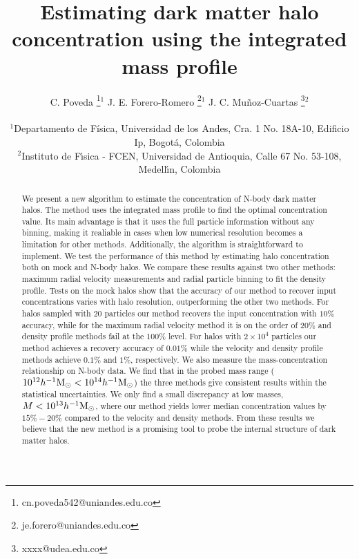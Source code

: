 \documentclass[a4,useAMS,usenatbib,usegraphicx]{mn2e}
\newcommand{\hMsun}{{\ifmmode{h^{-1}{\rm {M_{\odot}}}}\else{$h^{-1}{\rm{M_{\odot}}}$}\fi}}
\begin{document}
\title[Halo concentration from the mass profile]{Estimating dark matter
  halo concentration using the integrated mass profile} 
\author[C. Poveda, J.E. Forero-Romero, J.C. Mu\~noz-Cuartas]{
\parbox[t]{\textwidth}{\raggedright 
  C. Poveda \thanks{cn.poveda542@uniandes.edu.co}$^{1}$
  J. E. Forero-Romero \thanks{je.forero@uniandes.edu.co}$^{1}$
  J. C. Mu\~noz-Cuartas \thanks{xxxx@udea.edu.co}$^{2}$
}
\vspace*{6pt}\\
$^1$Departamento de F\'{i}sica, Universidad de los Andes, Cra. 1
No. 18A-10, Edificio Ip, Bogot\'a, Colombia\\
$^2$Instituto de F\'{\i}sica - FCEN, Universidad de Antioquia, Calle
67 No. 53-108, Medell\'{\i}n, Colombia
}

\maketitle

\begin{abstract}
We present a new algorithm to estimate the concentration of N-body
dark matter halos.
The method uses the integrated mass profile to find the optimal
concentration value. 
Its main advantage is that it uses the full particle information
without any binning, making it realiable in  cases when low numerical
resolution becomes a limitation for other methods.  
Additionally, the algorithm is straightforward to implement.  
We test the performance of this method by estimating halo
concentration both on mock and N-body halos. 
We compare these results against two other methods:
maximum radial velocity measurements and radial particle binning to
fit the density profile. 
Tests on the mock halos show that the accuracy of our method to recover input
concentrations varies with halo resolution, outperforming the other
two methods. 
For halos sampled with $20$ particles our method recovers the input
concentration with $10\%$ accuracy, while for the maximum radial
velocity method it is on the order of $20\%$ and density profile
methods fail at the $100\%$ level. 
For halos with $2\times 10^4$ particles our method achieves a recovery
accuracy of $0.01\%$ while the velocity and density profile methods
achieve $0.1\%$ and $1\%$, respectively. 
We also measure the mass-concentration relationship on N-body
data. 
We find that in the probed mass range ($10^{12}\hMsun <
10^{14}\hMsun$) the three methods give consistent results within the
statistical uncertainties.   
We only find a small discrepancy at low masses, $M<10^{13}\hMsun$, where
our method yields lower median concentration values by $15\%-20\%$
compared to the velocity and density methods. 
From these results we believe that the new method is a promising tool
to probe the internal structure of dark matter halos.
\end{abstract}
\end{document}
